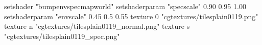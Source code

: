 setshader "bumpenvspecmapworld"
setshaderparam "specscale" 0.90 0.95 1.00
setshaderparam "envscale"  0.45 0.5 0.55
    texture 0 "cgtextures/tilesplain0119.png"
    texture n "cgtextures/tilesplain0119_normal.png"
    texture s "cgtextures/tilesplain0119_spec.png"